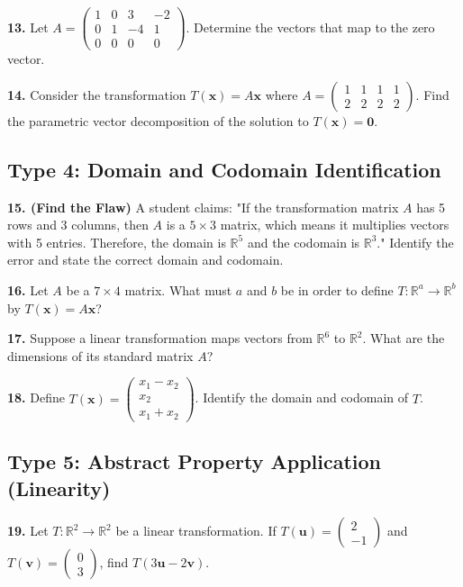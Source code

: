 \documentclass{article}
\begin{document}
\vspace{0.3cm}
\textbf{13.} Let $A = \begin{pmatrix} 1 & 0 & 3 & -2 \\ 0 & 1 & -4 & 1 \\ 0 & 0 & 0 & 0 \end{pmatrix}$. Determine the vectors that map to the zero vector.

\vspace{0.3cm}
\textbf{14.} Consider the transformation $T(\mathbf{x}) = A\mathbf{x}$ where $A = \begin{pmatrix} 1 & 1 & 1 & 1 \\ 2 & 2 & 2 & 2 \end{pmatrix}$. Find the parametric vector decomposition of the solution to $T(\mathbf{x}) = \mathbf{0}$. 

\subsection*{Type 4: Domain and Codomain Identification}
\textbf{15. (Find the Flaw)} A student claims: "If the transformation matrix $A$ has 5 rows and 3 columns, then $A$ is a $5 \times 3$ matrix, which means it multiplies vectors with 5 entries. Therefore, the domain is $\mathbb{R}^5$ and the codomain is $\mathbb{R}^3$." Identify the error and state the correct domain and codomain.

\vspace{0.3cm}
\textbf{16.} Let $A$ be a $7 \times 4$ matrix. What must $a$ and $b$ be in order to define $T: \mathbb{R}^a \to \mathbb{R}^b$ by $T(\mathbf{x}) = A\mathbf{x}$?

\vspace{0.3cm}
\textbf{17.} Suppose a linear transformation maps vectors from $\mathbb{R}^6$ to $\mathbb{R}^2$. What are the dimensions of its standard matrix $A$?

\vspace{0.3cm}
\textbf{18.} Define $T(\mathbf{x}) = \begin{pmatrix} x_1 - x_2 \\ x_2 \\ x_1 + x_2 \end{pmatrix}$. Identify the domain and codomain of $T$.

\subsection*{Type 5: Abstract Property Application (Linearity)}
\textbf{19.} Let $T: \mathbb{R}^2 \to \mathbb{R}^2$ be a linear transformation. If $T(\mathbf{u}) = \begin{pmatrix} 2 \\ -1 \end{pmatrix}$ and $T(\mathbf{v}) = \begin{pmatrix} 0 \\ 3 \end{pmatrix}$, find $T(3\mathbf{u} - 2\mathbf{v})$.
\end{document}
